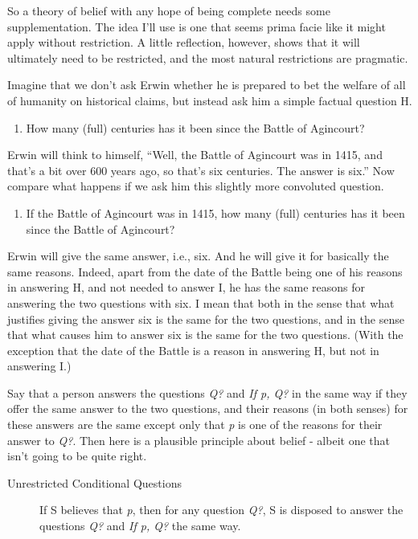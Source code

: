 \documentclass[
  12pt,
  letterpaper,
]{scrbook}
\providecommand{\tightlist}{%
  \setlength{\itemsep}{0pt}\setlength{\parskip}{0pt}}\usepackage{longtable,booktabs,array}
\begin{document}
So a theory of belief with any hope of being complete needs some
supplementation. The idea I'll use is one that seems prima facie like it
might apply without restriction. A little reflection, however, shows
that it will ultimately need to be restricted, and the most natural
restrictions are pragmatic.

Imagine that we don't ask Erwin whether he is prepared to bet the
welfare of all of humanity on historical claims, but instead ask him a
simple factual question H.

\begin{enumerate}
\def\labelenumi{\Alph{enumi}.}
\setcounter{enumi}{7}
\tightlist
\item
  How many (full) centuries has it been since the Battle of Agincourt?
\end{enumerate}

Erwin will think to himself, ``Well, the Battle of Agincourt was in
1415, and that's a bit over 600 years ago, so that's six centuries. The
answer is six.'' Now compare what happens if we ask him this slightly
more convoluted question.

\begin{enumerate}
\def\labelenumi{\Roman{enumi}.}
\tightlist
\item
  If the Battle of Agincourt was in 1415, how many (full) centuries has
  it been since the Battle of Agincourt?
\end{enumerate}

Erwin will give the same answer, i.e., six. And he will give it for
basically the same reasons. Indeed, apart from the date of the Battle
being one of his reasons in answering H, and not needed to answer I, he
has the same reasons for answering the two questions with six. I mean
that both in the sense that what justifies giving the answer six is the
same for the two questions, and in the sense that what causes him to
answer six is the same for the two questions. (With the exception that
the date of the Battle is a reason in answering H, but not in answering
I.)

Say that a person answers the questions \emph{Q?} and \emph{If p, Q?} in
the same way if they offer the same answer to the two questions, and
their reasons (in both senses) for these answers are the same except
only that \emph{p} is one of the reasons for their answer to \emph{Q?}.
Then here is a plausible principle about belief - albeit one that isn't
going to be quite right.

\begin{description}
\item[Unrestricted Conditional Questions]
If S believes that \emph{p}, then for any question \emph{Q?}, S is
disposed to answer the questions \emph{Q?} and \emph{If p, Q?} the same
way.
\end{description}
\end{document}
